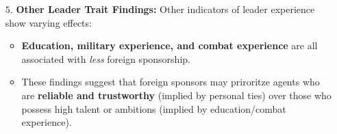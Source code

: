 \documentclass{article}
\begin{document}
\begin{itemize}
        \item[$5$.] \textbf{Other Leader Trait Findings:} Other indicators
        of leader experience show varying effects:
        \begin{itemize}
            \item
            \textbf{Education, military experience, and combat experience}
            are all associated with \textit{less} foreign sponsorship.
            \item These findings suggest that foreign sponsors may
            priroritze agents who are
            \textbf{reliable and trustworthy} (implied by personal ties)
            over those who possess high talent or ambitions (implied by
            education/combat experience).
        \end{itemize}
    \end{itemize}

    
\end{document}
